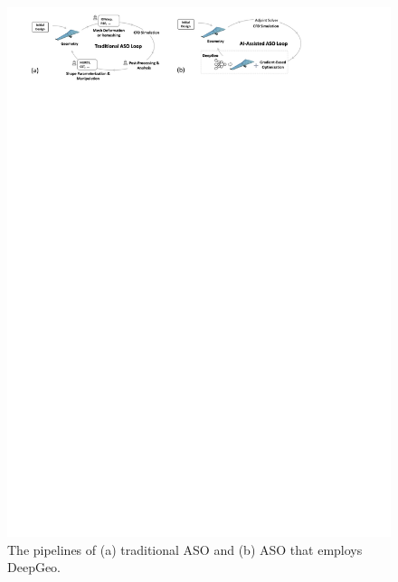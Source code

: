 
\begin{figure}[tbh]
    \begin{center}
        \includegraphics[width=1\linewidth]{chapter5/fig/aso_pipeline.pdf}
    \end{center}
    \vspace{-3mm}
    \caption{
        \small The pipelines of (a) traditional ASO and (b) ASO that employs DeepGeo.
    }
    \label{ch5:fig:aso_pipeline}
\end{figure}